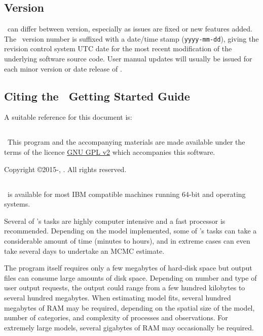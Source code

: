 \subsection{Version\label{sec:version}}

\CNAME\ can differ between version, especially as issues are fixed or new features added. The \CNAME\ version number is suffixed with a date/time stamp (\texttt{yyyy-mm-dd}), giving the revision control system UTC date for the most recent modification of the underlying software source code. User manual updates will usually be issued for each minor version or date release of \CNAME.

\subsection{Citing the \CNAME\ Getting Started Guide}
A suitable reference for this document is: 

\ManualRef{}
 
\subsection{}
\
This program and the accompanying materials are made available under the terms of the licence \href{http://www.gnu.org/licenses/old-licenses/gpl-2.0.en.html}{GNU GPL v2} which accompanies this software.

Copyright \copyright 2015-\SourceControlYearDoc, \href{http://www.niwa.co.nz}{\Organisation}. All rights reserved.

\subsection{}

\CNAME\ is available for most IBM compatible machines running 64-bit  and  operating systems.

Several of \CNAME's tasks are highly computer intensive and a fast processor is recommended. Depending on the model implemented, some of \CNAME's tasks can take a considerable amount of time (minutes to hours), and in extreme cases can even take several days to undertake an MCMC estimate. 

The program itself requires only a few megabytes of hard-disk space but output files can consume large amounts of disk space. Depending on number and type of user output requests, the output could range from a few hundred kilobytes to several hundred megabytes. When estimating model fits, several hundred megabytes of RAM may be required, depending on the spatial size of the model, number of categories, and complexity of processes and observations. For extremely large models, several gigabytes of RAM may occasionally be required. 

